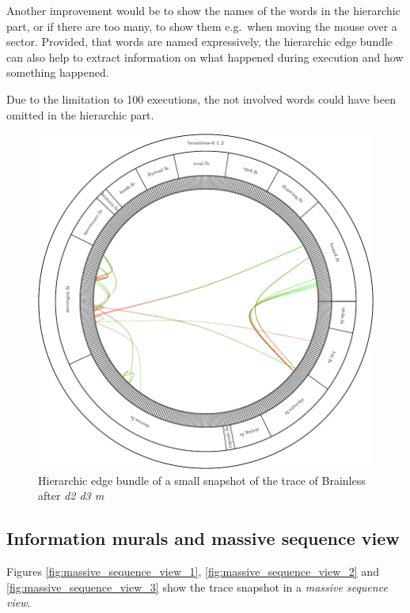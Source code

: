 Another improvement would be to show the names of the words in the hierarchic part, or if there are too many, to show them e.g.\ when moving the mouse over a sector.
Provided, that words are named expressively, the hierarchic edge bundle can also help to extract information on what happened during execution and how something happened. 

Due to the limitation to 100 executions, the not involved words could have been omitted in the hierarchic part.

\begin{figure}[p]
    \centering
    \includegraphics[scale=0.65]{graphics/hierarchic_edge_bundle-dir_file_word.png}
    \caption{Hierarchic edge bundle of a small snapshot of the trace of Brainless after \emph{d2 d3 m}}
    \label{fig:hierarchic_edge_bundle}
\end{figure}


\subsection*{Information murals and massive sequence view}

Figures \ref{fig:massive_sequence_view_1}, \ref{fig:massive_sequence_view_2} and \ref{fig:massive_sequence_view_3} show the trace snapshot in a \emph{massive sequence view}.

